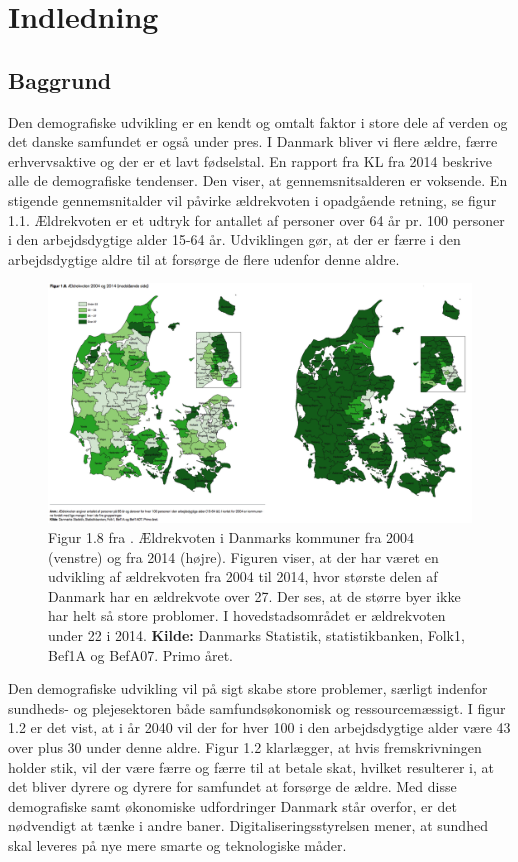\chapter{Indledning}

\section{Baggrund}
Den demografiske udvikling er en kendt og omtalt faktor i store dele af verden og  det danske samfundet er også under pres. I Danmark bliver vi flere ældre, færre erhvervsaktive og der er et lavt fødselstal. En rapport fra KL fra 2014 beskrive alle de demografiske tendenser. Den viser, at gennemsnitsalderen er voksende. En stigende gennemsnitalder vil påvirke ældrekvoten i opadgående retning, se figur 1.1. Ældrekvoten er et udtryk for antallet af personer over 64 år pr. 100 personer i den arbejdsdygtige alder 15-64 år\cite{KL}.  Udviklingen gør, at der er færre i den arbejdsdygtige aldre til at forsørge de flere udenfor denne aldre. 

\begin{figure}[H]
\centering
\caption{Figur 1.8 fra \cite{KL}. Ældrekvoten i Danmarks kommuner fra 2004 (venstre) og fra 2014 (højre). Figuren viser, at der har været en udvikling af ældrekvoten fra 2004 til 2014, hvor største delen af Danmark har en ældrekvote over 27. Der ses, at de større byer ikke har helt så store problomer. I hovedstadsområdet er ældrekvoten under 22 i 2014. \textbf{Kilde:} Danmarks Statistik, statistikbanken, Folk1, Bef1A og BefA07. Primo året.}
\includegraphics[width=1\textwidth]{Figurer/Snip20160428_14}
\end{figure}

Den demografiske udvikling vil på sigt skabe store problemer, særligt indenfor sundheds- og plejesektoren både samfundsøkonomisk og ressourcemæssigt. I figur 1.2 er det vist, at i år 2040 vil der for hver 100 i den arbejdsdygtige alder være 43 over plus 30 under denne aldre. Figur 1.2 klarlægger, at hvis fremskrivningen holder stik, vil der være færre og færre til at betale skat, hvilket resulterer i, at det bliver dyrere og dyrere for samfundet at forsørge de ældre. Med disse demografiske samt økonomiske udfordringer Danmark står overfor, er det nødvendigt at tænke i andre baner. Digitaliseringsstyrelsen mener, at sundhed skal leveres på nye mere smarte og teknologiske måder\cite{Digst}.


